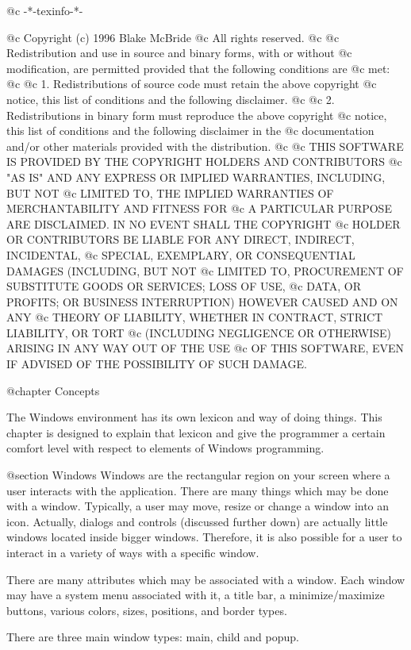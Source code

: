 @c -*-texinfo-*-

@c  Copyright (c) 1996 Blake McBride
@c  All rights reserved.
@c
@c  Redistribution and use in source and binary forms, with or without
@c  modification, are permitted provided that the following conditions are
@c  met:
@c
@c  1. Redistributions of source code must retain the above copyright
@c  notice, this list of conditions and the following disclaimer.
@c
@c  2. Redistributions in binary form must reproduce the above copyright
@c  notice, this list of conditions and the following disclaimer in the
@c  documentation and/or other materials provided with the distribution.
@c
@c  THIS SOFTWARE IS PROVIDED BY THE COPYRIGHT HOLDERS AND CONTRIBUTORS
@c  "AS IS" AND ANY EXPRESS OR IMPLIED WARRANTIES, INCLUDING, BUT NOT
@c  LIMITED TO, THE IMPLIED WARRANTIES OF MERCHANTABILITY AND FITNESS FOR
@c  A PARTICULAR PURPOSE ARE DISCLAIMED. IN NO EVENT SHALL THE COPYRIGHT
@c  HOLDER OR CONTRIBUTORS BE LIABLE FOR ANY DIRECT, INDIRECT, INCIDENTAL,
@c  SPECIAL, EXEMPLARY, OR CONSEQUENTIAL DAMAGES (INCLUDING, BUT NOT
@c  LIMITED TO, PROCUREMENT OF SUBSTITUTE GOODS OR SERVICES; LOSS OF USE,
@c  DATA, OR PROFITS; OR BUSINESS INTERRUPTION) HOWEVER CAUSED AND ON ANY
@c  THEORY OF LIABILITY, WHETHER IN CONTRACT, STRICT LIABILITY, OR TORT
@c  (INCLUDING NEGLIGENCE OR OTHERWISE) ARISING IN ANY WAY OUT OF THE USE
@c  OF THIS SOFTWARE, EVEN IF ADVISED OF THE POSSIBILITY OF SUCH DAMAGE.


@chapter Concepts

The Windows environment has its own lexicon and way of doing things.
This chapter is designed to explain that lexicon and give the programmer
a certain comfort level with respect to elements of Windows programming.

@section Windows
Windows are the rectangular region on your screen where a user interacts
with the application.  There are many things which may be done with a window.
Typically, a user may move, resize or change a window into an icon.  Actually,
dialogs and controls (discussed further down) are actually little windows
located inside bigger windows.  Therefore, it is also possible for a user to
interact in a variety of ways with a specific window.

There are many attributes which may be associated with a window.  Each
window may have a system menu associated with it, a title bar, a
minimize/maximize buttons, various colors, sizes, positions, and border
types.  

There are three main window types: main, child and popup.



